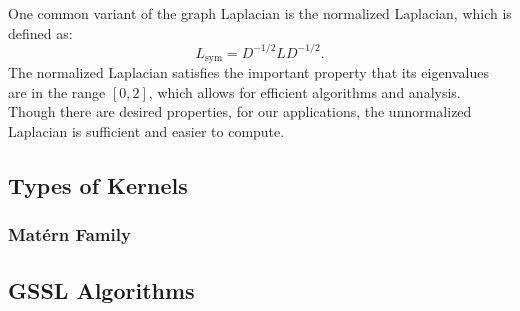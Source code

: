 \documentclass[12pt]{amsart}
\begin{document}
One common variant of the graph Laplacian is the normalized Laplacian, which is defined as:
$$ L_{\text{sym}} = D^{-1/2} L D^{-1/2}. $$
The normalized Laplacian satisfies the important property that its eigenvalues are in the range $[0, 2]$, which allows for efficient algorithms and analysis. Though there are desired properties, for our applications, the unnormalized Laplacian is sufficient and easier to compute.

\subsection{Types of Kernels}
\subsubsection{Mat\'{e}rn Family}

\subsection{GSSL Algorithms}
\end{document}
